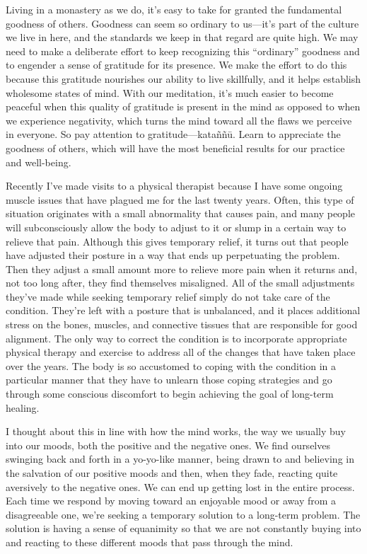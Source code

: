 Living in a monastery as we do, it's easy to take for granted the 
fundamental goodness of others. Goodness can seem so ordinary to 
us---it's part of the culture we live in here, and the standards we 
keep in that regard are quite high. We may need to make a deliberate 
effort to keep recognizing this ``ordinary'' goodness and to engender a 
sense of gratitude for its presence. We make the effort to do this 
because this gratitude nourishes our ability to live skillfully, and it 
helps establish wholesome states of mind. With our meditation, it's 
much easier to become peaceful when this quality of gratitude is 
present in the mind as opposed to when we experience negativity, which 
turns the mind toward all the flaws we perceive in everyone. So pay 
attention to gratitude---kataññū. Learn to appreciate the goodness 
of others, which will have the most beneficial results for our practice 
and well-being.


Recently I've made visits to a physical therapist because I have some 
ongoing muscle issues that have plagued me for the last twenty years. 
Often, this type of situation originates with a small abnormality that 
causes pain, and many people will subconsciously allow the body to 
adjust to it or slump in a certain way to relieve that pain. Although 
this gives temporary relief, it turns out that people have adjusted 
their posture in a way that ends up perpetuating the problem. Then they 
adjust a small amount more to relieve more pain when it returns and, 
not too long after, they find themselves misaligned. All of the small 
adjustments they've made while seeking temporary relief simply do not 
take care of the condition. They're left with a posture that is 
unbalanced, and it places additional stress on the bones, muscles, and 
connective tissues that are responsible for good alignment. The only 
way to correct the condition is to incorporate appropriate physical 
therapy and exercise to address all of the changes that have taken 
place over the years. The body is so accustomed to coping with the 
condition in a particular manner that they have to unlearn those coping 
strategies and go through some conscious discomfort to begin achieving 
the goal of long-term healing.

I thought about this in line with how the mind works, the way we 
usually buy into our moods, both the positive and the negative ones. We 
find ourselves swinging back and forth in a yo-yo-like manner, being 
drawn to and believing in the salvation of our positive moods and then, 
when they fade, reacting quite aversively to the negative ones. We can 
end up getting lost in the entire process. Each time we respond by 
moving toward an enjoyable mood or away from a disagreeable one, we're 
seeking a temporary solution to a long-term problem. The solution is 
having a sense of equanimity so that we are not constantly buying into 
and reacting to these different moods that pass through the mind.

